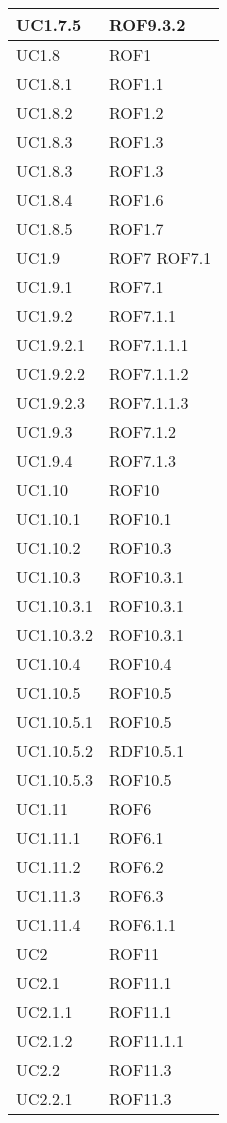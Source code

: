 \begin{center}
\begin{longtable}{| p{4cm} | p{4cm} |}
\hline
UC1.7.5 & ROF9.3.2 \\
\hline
UC1.8 & ROF1 \\
\hline
UC1.8.1 & ROF1.1 \\
\hline
UC1.8.2 & ROF1.2 \\
\hline
UC1.8.3 & ROF1.3 \\
\hline
UC1.8.3 & ROF1.3 \\
\hline
UC1.8.4 & ROF1.6 \\
\hline
UC1.8.5 & ROF1.7 \\
\hline
UC1.9 & ROF7 \newline ROF7.1 \\
\hline
UC1.9.1 & ROF7.1 \\
\hline
UC1.9.2 & ROF7.1.1 \\
\hline
UC1.9.2.1 & ROF7.1.1.1 \\
\hline
UC1.9.2.2 & ROF7.1.1.2 \\
\hline
UC1.9.2.3 & ROF7.1.1.3 \\
\hline
UC1.9.3 & ROF7.1.2 \\
\hline
UC1.9.4 & ROF7.1.3 \\
\hline
UC1.10 & ROF10 \\
\hline
UC1.10.1 & ROF10.1 \\
\hline
UC1.10.2 & ROF10.3 \\
\hline
UC1.10.3 & ROF10.3.1 \\
\hline
UC1.10.3.1 & ROF10.3.1 \\
\hline
UC1.10.3.2 & ROF10.3.1 \\
\hline
UC1.10.4 & ROF10.4 \\
\hline
UC1.10.5 & ROF10.5 \\
\hline
UC1.10.5.1 & ROF10.5 \\
\hline
UC1.10.5.2 & RDF10.5.1 \\
\hline
UC1.10.5.3 & ROF10.5 \\
\hline
UC1.11 & ROF6 \\
\hline
UC1.11.1 & ROF6.1 \\
\hline
UC1.11.2 & ROF6.2 \\
\hline
UC1.11.3 & ROF6.3 \\
\hline
UC1.11.4 & ROF6.1.1 \\
\hline
UC2 & ROF11 \\
\hline
UC2.1 & ROF11.1 \\
\hline
UC2.1.1 & ROF11.1 \\
\hline
UC2.1.2 & ROF11.1.1 \\
\hline
UC2.2 & ROF11.3 \\
\hline
UC2.2.1 & ROF11.3 \\

\end{longtable}
\end{center}
